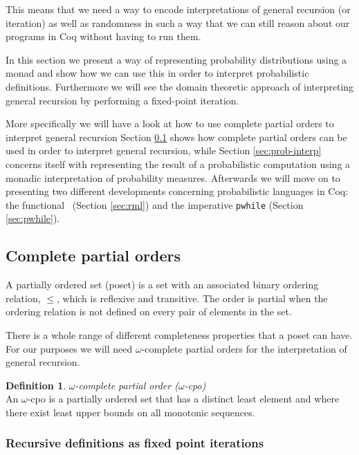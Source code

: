 \documentclass[11pt, leqno, titlepage]{article}
\theoremstyle{definition}
\newtheorem{defn}[thm]{Definition}
\begin{document}
This means that we need a way to encode interpretations of general recursion (or
iteration) as well as randomness in such a way that we can still reason about our
programs in Coq without having to run them.

In this section we present a way of representing probability distributions using a
monad and show how we can use this in order to interpret probabilistic
definitions. Furthermore we will see the domain theoretic approach of interpreting
general recursion by performing a fixed-point iteration. 

More specifically we will have a look at how to use complete partial orders to
interpret general recursion
Section \ref{sec:cpos} shows how complete partial orders can be used in order to
interpret general recursion, while Section \ref{sec:prob-interp} concerns itself with
representing the result of a probabilistic computation using a monadic interpretation
of probability measures. Afterwards we will move on to presenting two different
developments concerning probabilistic languages in Coq: the functional \rml\ (Section
\ref{sec:rml}) and the imperative \texttt{pwhile} (Section \ref{sec:pwhile}).

\subsection{Complete partial orders}
\label{sec:cpos}
A partially ordered set (poset) is a set with an associated binary ordering relation,
$\leq$, which is reflexive and transitive. The order is partial when the ordering
relation is not defined on every pair of elements in the set.

There is a whole range of different completeness properties that a poset can have.
For our purposes we will need $\omega$-complete partial orders for the interpretation
of general recursion.  

\begin{defn}
  \textit{$\omega$-complete partial order ($\omega$-cpo)}\\
  An $\omega$-cpo is a partially ordered set that has a distinct least element and
  where there exist least upper bounds on all monotonic sequences.
\end{defn}

\subsubsection{Recursive definitions as fixed point iterations}
\label{sec:fixp-iter}
\end{document}
